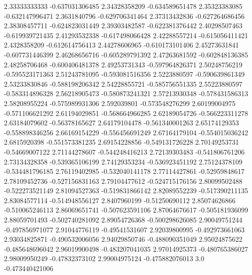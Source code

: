   2.33333333333  -0.637031306485
  2.34328358209  -0.634589651478
  2.35323383085  -0.632147996471
   2.3631840796  -0.629706341464
  2.37313432836  -0.627264686456
  2.38308457711  -0.624823031449
  2.39303482587  -0.622381376442
  2.40298507463  -0.619939721435
  2.41293532338  -0.617498066428
  2.42288557214  -0.615056411421
   2.4328358209  -0.612614756413
  2.44278606965  -0.610173101406
  2.45273631841  -0.607731446399
  2.46268656716  -0.605289791392
  2.47263681592  -0.602848136385
  2.48258706468  -0.600406481378
  2.49253731343  -0.597964826371
  2.50248756219  -0.595523171363
  2.51243781095  -0.593081516356
   2.5223880597  -0.590639861349
  2.53233830846  -0.588198206342
  2.54228855721  -0.585756551335
  2.55223880597  -0.583314896328
  2.56218905473  -0.580873241321
  2.57213930348  -0.578431586313
  2.58208955224  -0.575989931306
    2.592039801  -0.573548276299
  2.60199004975  -0.571106621292
  2.61194029851  -0.568664966285
  2.62189054726  -0.566223311278
  2.63184079602   -0.56378165627
  2.64179104478  -0.561340001263
  2.65174129353  -0.558898346256
  2.66169154229  -0.556456691249
  2.67164179104  -0.554015036242
   2.6815920398  -0.551573381235
  2.69154228856  -0.549131726228
  2.70149253731   -0.54669007122
  2.71144278607  -0.544248416213
  2.72139303483  -0.541806761206
  2.73134328358  -0.539365106199
  2.74129353234  -0.536923451192
  2.75124378109  -0.534481796185
  2.76119402985  -0.532040141178
  2.77114427861   -0.52959848617
  2.78109452736  -0.527156831163
  2.79104477612  -0.524715176156
  2.80099502488  -0.522273521149
  2.81094527363  -0.519831866142
  2.82089552239  -0.517390211135
  2.83084577114  -0.514948556127
   2.8407960199   -0.51250690112
  2.85074626866  -0.510065246113
  2.86069651741  -0.507623591106
  2.87064676617  -0.505181936099
  2.88059701493  -0.502740281092
  2.89054726368  -0.500298626085
  2.90049751244  -0.497856971077
  2.91044776119   -0.49541531607
  2.92039800995  -0.492973661063
  2.93034825871  -0.490532006056
  2.94029850746  -0.488090351049
  2.95024875622  -0.485648696042
  2.96019900498  -0.483207041035
  2.97014925373  -0.480765386027
  2.98009950249   -0.47832373102
  2.99004975124  -0.475882076013
            3.0  -0.473440421006

